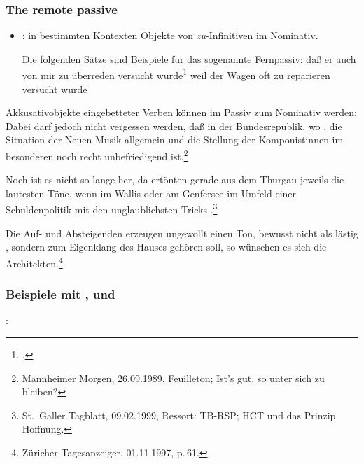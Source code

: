 \subsubsection{The remote passive}
\label{sec-remote-passive-phen}


\begin{itemize}
\item \citet[--176]{Hoehle78a}: in bestimmten Kontexten Objekte
von \emph{zu}-Infinitiven im Nominativ.

Die folgenden Sätze sind Beispiele für das sogenannte Fernpassiv:
\eal
\ex
daß er auch von mir zu überreden versucht wurde\footnote{
        .%
}
\ex
weil    der Wagen oft zu reparieren versucht wurde
\zl
\end{itemize}



Akkusativobjekte eingebetteter Verben können im Passiv zum Nominativ werden:
\eal
\ex Dabei darf jedoch nicht vergessen werden, daß in der Bundesrepublik, wo  , 
die Situation der Neuen Musik allgemein und die Stellung der Komponistinnen im besonderen noch recht unbefriedigend ist.\footnote{
Mannheimer Morgen, 26.09.1989, Feuilleton; Ist's gut, so unter sich zu bleiben?
}

\ex Noch ist es nicht so lange her, da ertönten gerade aus dem Thurgau jeweils die lautesten Töne, 
    wenn im Wallis oder am Genfersee im Umfeld einer Schuldenpolitik mit den unglaublichsten Tricks 
     .\footnote{
St.\ Galler Tagblatt, 09.02.1999, Ressort: TB-RSP; HCT und das Prinzip Hoffnung.%
}

\ex Die Auf- und Absteigenden erzeugen ungewollt einen Ton,
         bewusst nicht als lästig , 
    sondern zum Eigenklang des Hauses gehören soll, so wünschen es sich die Architekten.\footnote{
Züricher Tagesanzeiger, 01.11.1997, p.\,61.%
}
\zl



\subsubsection{Beispiele mit ,  und }

\citet{Wurmbrand2003a}:
\eal

